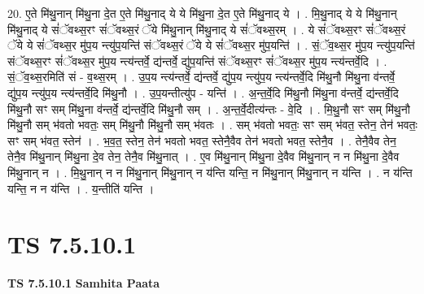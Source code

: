 \documentclass[17pt]{extarticle}
\begin{document}
20. ए॒ते मि॑थु॒नान् मि॑थु॒ना दे॒त ए॒ते मि॑थु॒नाद् ये ये मि॑थु॒ना दे॒त ए॒ते मि॑थु॒नाद् ये । . मि॒थु॒नाद् ये ये मि॑थु॒नान् मि॑थु॒नाद् ये सं॑ॅवथ्स॒रꣳ सं॑ॅवथ्स॒रं ॅये मि॑थु॒नान् मि॑थु॒नाद् ये सं॑ॅवथ्स॒रम् । . ये सं॑ॅवथ्स॒रꣳ सं॑ॅवथ्स॒रं ॅये ये सं॑ॅवथ्स॒र मु॑प॒य न्त्यु॑प॒यन्ति॑ संॅवथ्स॒रं ॅये ये सं॑ॅवथ्स॒र मु॑प॒यन्ति॑ । . सं॒ॅव॒थ्स॒र मु॑प॒य न्त्यु॑प॒यन्ति॑ संॅवथ्स॒रꣳ सं॑ॅवथ्स॒र मु॑प॒य न्त्य॑न्तर्वे॒ द्य॑न्तर्वे॒ द्यु॑प॒यन्ति॑ संॅवथ्स॒रꣳ सं॑ॅवथ्स॒र मु॑प॒य न्त्य॑न्तर्वे॒दि । . सं॒ॅव॒थ्स॒रमिति॑ सं - व॒थ्स॒रम् । . उ॒प॒य न्त्य॑न्तर्वे॒ द्य॑न्तर्वे॒ द्यु॑प॒य न्त्यु॑प॒य न्त्य॑न्तर्वे॒दि मि॑थु॒नौ मि॑थु॒ना व॑न्तर्वे॒ द्यु॑प॒य न्त्यु॑प॒य न्त्य॑न्तर्वे॒दि मि॑थु॒नौ । . उ॒प॒यन्तीत्यु॑प - यन्ति॑ । . अ॒न्त॒र्वे॒दि मि॑थु॒नौ मि॑थु॒ना व॑न्तर्वे॒ द्य॑न्तर्वे॒दि मि॑थु॒नौ सꣳ सम् मि॑थु॒ना व॑न्तर्वे॒ द्य॑न्तर्वे॒दि मि॑थु॒नौ सम् । . अ॒न्त॒र्वे॒दीत्य॑न्तः - वे॒दि । . मि॒थु॒नौ सꣳ सम् मि॑थु॒नौ मि॑थु॒नौ सम् भ॑वतो भवतः॒ सम् मि॑थु॒नौ मि॑थु॒नौ सम् भ॑वतः । . सम् भ॑वतो भवतः॒ सꣳ सम् भ॑वत॒ स्तेन॒ तेन॑ भवतः॒ सꣳ सम् भ॑वत॒ स्तेन॑ । . भ॒व॒त॒ स्तेन॒ तेन॑ भवतो भवत॒ स्तेनै॒वैव तेन॑ भवतो भवत॒ स्तेनै॒व । . तेनै॒वैव तेन॒ तेनै॒व मि॑थु॒नान् मि॑थु॒ना दे॒व तेन॒ तेनै॒व मि॑थु॒नात् । . ए॒व मि॑थु॒नान् मि॑थु॒ना दे॒वैव मि॑थु॒नान् न न मि॑थु॒ना दे॒वैव मि॑थु॒नान् न । . मि॒थु॒नान् न न मि॑थु॒नान् मि॑थु॒नान् न य॑न्ति यन्ति॒ न मि॑थु॒नान् मि॑थु॒नान् न य॑न्ति । . न य॑न्ति यन्ति॒ न न य॑न्ति । . य॒न्तीति॑ यन्ति । \newline
\pagebreak
{}

\section{ TS 7.5.10.1 }

\textbf{TS 7.5.10.1 } \newline
\textbf{Samhita Paata} \newline
\end{document}

